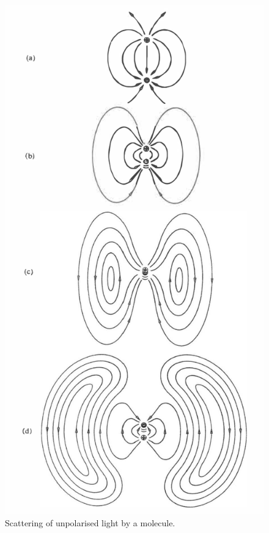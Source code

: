 \documentclass{article}
\begin{document}
\begin{figure}[H]
    \centering
    \includegraphics[scale=0.5]{efiled.png}
    \caption{Scattering of unpolarised light by a molecule.}
    \label{fig:dipole}
\end{figure}
\end{document}
